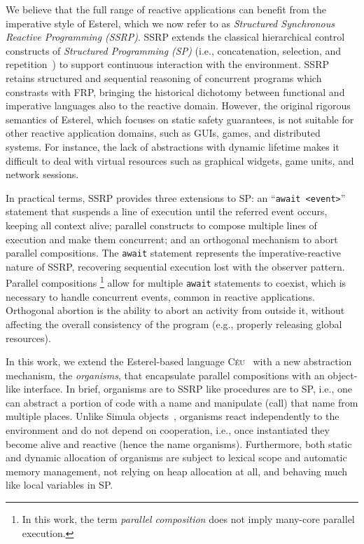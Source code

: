 \documentclass{sigplanconf}
\newcommand{\CEU}{\textsc{C\'{e}u}\xspace}
\newcommand{\code}[1] {{\small{\texttt{#1}}}}
\newcommand{\1}{\;}
\newcommand{\2}{\;\;}
\newcommand{\3}{\;\;\;}
\newcommand{\5}{\;\;\;\;\;}
\begin{document}
We believe that the full range of reactive applications can benefit from the 
imperative style of Esterel, which we now refer to as \emph{Structured 
Synchronous Reactive Programming (SSRP)}.
%
SSRP extends the classical hierarchical control constructs of \emph{Structured 
Programming (SP)} (i.e., concatenation, selection, and 
repetition~\cite{dij.notes}) to support continuous interaction with the 
environment.
%
SSRP retains structured and sequential reasoning of concurrent programs which 
constrasts with FRP, bringing the historical dichotomy between functional and 
imperative languages also to the reactive domain.
%
However, the original rigorous semantics of Esterel, which focuses on static 
safety guarantees, is not suitable for other reactive application domains, such 
as GUIs, games, and distributed systems.
%
For instance, the lack of abstractions with dynamic lifetime makes it difficult 
to deal with virtual resources such as graphical widgets, game units, and 
network sessions.

In practical terms, SSRP provides three extensions to SP:
an ``\code{await <event>}'' statement that suspends a line of execution until 
the referred event occurs, keeping all context alive;
parallel constructs to compose multiple lines of execution and make them 
concurrent;
and an orthogonal mechanism to abort parallel compositions.
%
The \code{await} statement represents the imperative-reactive nature of SSRP, 
recovering sequential execution lost with the observer pattern.
%
Parallel compositions%
\footnote{
In this work, the term \emph{parallel composition} does not imply many-core 
parallel execution.
}
allow for multiple \code{await} statements to coexist, which is necessary to 
handle concurrent events, common in reactive applications.
%
Orthogonal abortion is the ability to abort an activity from outside it, 
without affecting the overall consistency of the program (e.g., properly 
releasing global resources).

In this work, we extend the Esterel-based language \CEU~\cite{ceu.sensys13} 
with a new abstraction mechanism, the \emph{organisms}, that encapsulate 
parallel compositions with an object-like interface.
%
In brief, organisms are to SSRP like procedures are to SP, i.e., one can 
abstract a portion of code with a name and manipulate (call) that name from 
multiple places.
%
Unlike Simula objects~\cite{simula}, organisms react independently to the 
environment and do not depend on cooperation, i.e., once instantiated they 
become alive and reactive (hence the name organisms).
%
Furthermore, both static and dynamic allocation of organisms are subject to 
lexical scope and automatic memory management, not relying on heap allocation 
at all, and behaving much like local variables in SP.
%
\end{document}

